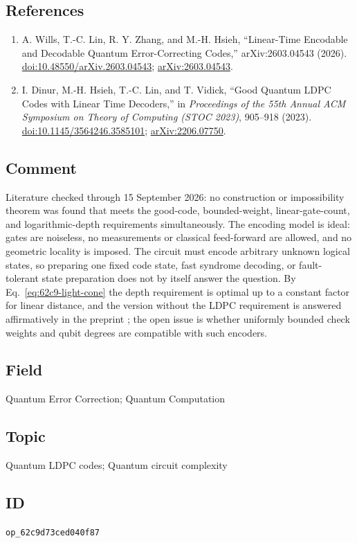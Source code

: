 \subsection*{References}

\begin{enumerate}[label={},leftmargin=4.8em,labelsep=0.5em]
  \footnotesize
  \item[\textup{[WLZ+26]}]\label{ref:62c9-wlzh}
  A. Wills, T.-C. Lin, R. Y. Zhang, and M.-H. Hsieh, ``Linear-Time Encodable
and Decodable Quantum Error-Correcting Codes,'' arXiv:2603.04543 (2026).
\href{https://doi.org/10.48550/arXiv.2603.04543}{doi:10.48550/arXiv.2603.04543};
\href{https://arxiv.org/abs/2603.04543}{arXiv:2603.04543}.

  \item[\textup{[DHLV23]}]\label{ref:62c9-dhlv}
  I. Dinur, M.-H. Hsieh, T.-C. Lin, and T. Vidick, ``Good Quantum LDPC Codes
with Linear Time Decoders,'' in \emph{Proceedings of the 55th Annual ACM
Symposium on Theory of Computing (STOC 2023)}, 905--918 (2023).
\href{https://doi.org/10.1145/3564246.3585101}{doi:10.1145/3564246.3585101};
\href{https://arxiv.org/abs/2206.07750}{arXiv:2206.07750}.
\end{enumerate}

\subsection*{Comment}

Literature checked through 15 September 2026: no construction or
impossibility theorem was found that meets the good-code, bounded-weight,
linear-gate-count, and logarithmic-depth requirements simultaneously.  The
encoding model is ideal: gates are noiseless, no measurements or classical
feed-forward are allowed, and no geometric locality is imposed.  The circuit
must encode arbitrary unknown logical states, so preparing one fixed code
state, fast syndrome decoding, or fault-tolerant state preparation does not by
itself answer the question.  By Eq.~\eqref{eq:62c9-light-cone} the depth
requirement is optimal up to a constant factor for linear distance, and the
version without the LDPC requirement is answered affirmatively in the preprint
; the open issue is whether uniformly
bounded check weights and qubit degrees are compatible with such encoders.

\subsection*{Field}

Quantum Error Correction; Quantum Computation

\subsection*{Topic}

Quantum LDPC codes; Quantum circuit complexity

\subsection*{ID}

\texttt{op\_62c9d73ced040f87}
